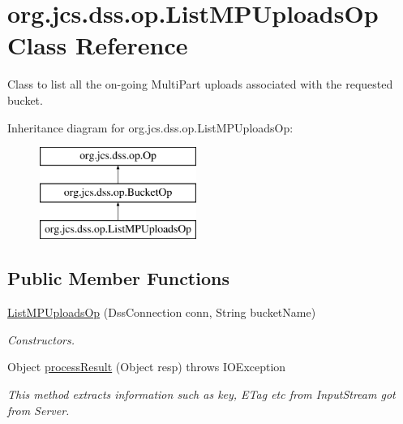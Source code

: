 \hypertarget{classorg_1_1jcs_1_1dss_1_1op_1_1ListMPUploadsOp}{}\section{org.\+jcs.\+dss.\+op.\+List\+M\+P\+Uploads\+Op Class Reference}
\label{classorg_1_1jcs_1_1dss_1_1op_1_1ListMPUploadsOp}


Class to list all the on-\/going Multi\+Part uploads associated with the requested bucket.  


Inheritance diagram for org.\+jcs.\+dss.\+op.\+List\+M\+P\+Uploads\+Op\+:\begin{figure}[H]
\begin{center}
\leavevmode
\includegraphics[height=3.000000cm]{classorg_1_1jcs_1_1dss_1_1op_1_1ListMPUploadsOp}
\end{center}
\end{figure}
\subsection*{Public Member Functions}
\begin{DoxyCompactItemize}
\item 
\hyperlink{classorg_1_1jcs_1_1dss_1_1op_1_1ListMPUploadsOp_a860cbabfda88cbbeeac14d14bb956d65}{List\+M\+P\+Uploads\+Op} (Dss\+Connection conn, String bucket\+Name)\hypertarget{classorg_1_1jcs_1_1dss_1_1op_1_1ListMPUploadsOp_a860cbabfda88cbbeeac14d14bb956d65}{}\label{classorg_1_1jcs_1_1dss_1_1op_1_1ListMPUploadsOp_a860cbabfda88cbbeeac14d14bb956d65}

\begin{DoxyCompactList}\small\item\em Constructors. \end{DoxyCompactList}\item 
Object \hyperlink{classorg_1_1jcs_1_1dss_1_1op_1_1ListMPUploadsOp_aa2e55e3ae139072f10b2777a1f879643}{process\+Result} (Object resp)  throws I\+O\+Exception
\begin{DoxyCompactList}\small\item\em This method extracts information such as key, E\+Tag etc from Input\+Stream got from Server. \end{DoxyCompactList}\end{DoxyCompactItemize}
